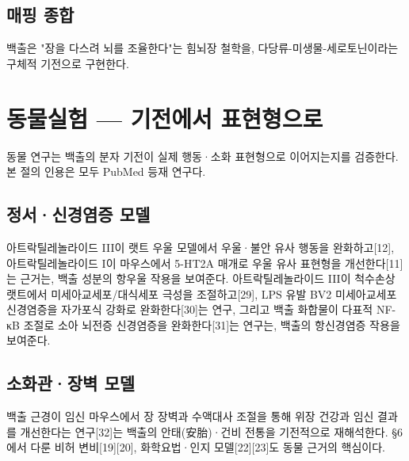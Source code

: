 \documentclass[11pt,oneside]{book}
\begin{document}
\subsection{매핑 종합}
\vspace{2pt}\vspace{3pt}

백출은 "장을 다스려 뇌를 조율한다"는 힘뇌장 철학을, 다당류-미생물-세로토닌이라는 구체적 기전으로 구현한다.

\section{동물실험 — 기전에서 표현형으로}
동물 연구는 백출의 분자 기전이 실제 행동·소화 표현형으로 이어지는지를 검증한다. 본 절의 인용은 모두 PubMed 등재 연구다.

\subsection{정서·신경염증 모델}
아트락틸레놀라이드 III이 랫트 우울 모델에서 우울·불안 유사 행동을 완화하고[12], 아트락틸레놀라이드 I이 마우스에서 5-HT2A 매개로 우울 유사 표현형을 개선한다[11]는 근거는, 백출 성분의 항우울 작용을 보여준다. 아트락틸레놀라이드 III이 척수손상 랫트에서 미세아교세포/대식세포 극성을 조절하고[29], LPS 유발 BV2 미세아교세포 신경염증을 자가포식 강화로 완화한다[30]는 연구, 그리고 백출 화합물이 다표적 NF-κB 조절로 소아 뇌전증 신경염증을 완화한다[31]는 연구는, 백출의 항신경염증 작용을 보여준다.

\subsection{소화관·장벽 모델}
백출 근경이 임신 마우스에서 장 장벽과 수액대사 조절을 통해 위장 건강과 임신 결과를 개선한다는 연구[32]는 백출의 안태(安胎)·건비 전통을 기전적으로 재해석한다. §6에서 다룬 비허 변비[19][20], 화학요법·인지 모델[22][23]도 동물 근거의 핵심이다.
\end{document}

